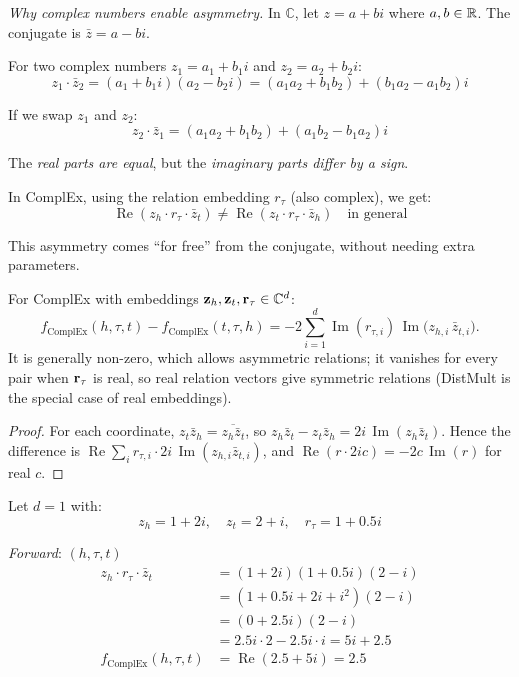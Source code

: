 \begin{notechapter}
\begin{intuition}
\emph{Why complex numbers enable asymmetry.}
In $\mathbb{C}$, let $z = a + bi$ where $a, b \in \mathbb{R}$. The conjugate is $\bar{z} = a - bi$.

For two complex numbers $z_1 = a_1 + b_1 i$ and $z_2 = a_2 + b_2 i$:
\[
z_1 \cdot \bar{z}_2 = (a_1 + b_1 i)(a_2 - b_2 i) = (a_1 a_2 + b_1 b_2) + (b_1 a_2 - a_1 b_2)i
\]

If we swap $z_1$ and $z_2$:
\[
z_2 \cdot \bar{z}_1 = (a_1 a_2 + b_1 b_2) + (a_1 b_2 - b_1 a_2)i
\]

The \emph{real parts are equal}, but the \emph{imaginary parts differ by a sign}.

In ComplEx, using the relation embedding $r_\tau$ (also complex), we get:
\[
\operatorname{Re}(z_h \cdot r_\tau \cdot \bar{z}_t) \neq \operatorname{Re}(z_t \cdot r_\tau \cdot \bar{z}_h) \quad \text{in general}
\]

This asymmetry comes ``for free'' from the conjugate, without needing extra parameters.
\end{intuition}

\begin{proposition}
For ComplEx with embeddings $\mathbf{z}_h, \mathbf{z}_t, \mathbf{r}_\tau \in \mathbb{C}^d$:
\begin{equation}
f_{\text{ComplEx}}(h, \tau, t) - f_{\text{ComplEx}}(t, \tau, h) = -2 \sum_{i=1}^{d} \operatorname{Im}(r_{\tau,i})\,\operatorname{Im}\bigl(z_{h,i}\,\bar z_{t,i}\bigr).
\end{equation}
It is generally non-zero, which allows asymmetric relations; it vanishes for every pair when $\mathbf{r}_\tau$ is real, so real relation vectors give symmetric relations (DistMult is the special case of real embeddings).
\end{proposition}

\begin{proof}
For each coordinate, $z_t\bar z_h = \overline{z_h\bar z_t}$, so $z_h\bar z_t - z_t\bar z_h = 2i\,\operatorname{Im}(z_h\bar z_t)$. Hence the difference is $\operatorname{Re}\sum_i r_{\tau,i}\cdot 2i\,\operatorname{Im}(z_{h,i}\bar z_{t,i})$, and $\operatorname{Re}(r\cdot 2ic) = -2c\,\operatorname{Im}(r)$ for real $c$.
\end{proof}

\begin{example}
Let $d = 1$ with:
\[
z_h = 1 + 2i, \quad z_t = 2 + i, \quad r_\tau = 1 + 0.5i
\]

\emph{Forward}: $(h, \tau, t)$
\begin{align*}
z_h \cdot r_\tau \cdot \bar{z}_t &= (1 + 2i)(1 + 0.5i)(2 - i) \\
&= (1 + 0.5i + 2i + i^2)(2 - i) \\
&= (0 + 2.5i)(2 - i) \\
&= 2.5i \cdot 2 - 2.5i \cdot i = 5i + 2.5 \\
f_{\text{ComplEx}}(h, \tau, t) &= \operatorname{Re}(2.5 + 5i) = 2.5
\end{align*}


\end{example}
\end{notechapter}
